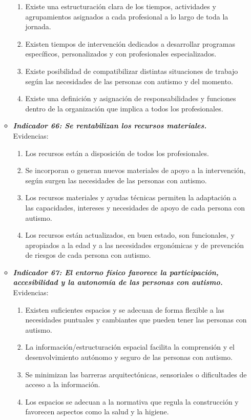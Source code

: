 \begin{itemize}
\begin{itemize}
		\begin{enumerate}
			\item Existe una estructuración clara de los tiempos, actividades y agrupamientos asignados a cada profesional a lo largo de toda la jornada. 
			\item Existen tiempos de intervención dedicados a desarrollar programas específicos, personalizados y con profesionales especializados.     
			\item Existe posibilidad de compatibilizar distintas situaciones de trabajo según las necesidades de las personas con autismo y del momento. 
			\item Existe una definición y asignación de responsabilidades y funciones dentro de la organización que implica a todos los profesionales.
		\end{enumerate}
		\item \textbf{\textit{Indicador 66: Se rentabilizan los recursos materiales.}}\\Evidencias:
		
		\begin{enumerate}
			\item Los recursos están a disposición de todos los profesionales. 
			\item Se incorporan o generan nuevos materiales de apoyo a la intervención, según surgen las necesidades de las personas con autismo. 
			\item Los recursos materiales y ayudas técnicas permiten la adaptación a las capacidades, intereses y necesidades de apoyo de cada persona con autismo. 
			\item Los recursos están actualizados, en buen estado, son funcionales, y apropiados a la edad y a las necesidades ergonómicas y de prevención de riesgos de cada persona con autismo. 
			 
		\end{enumerate}
		\item \textbf{\textit{Indicador 67: El entorno físico favorece la participación, accesibilidad y la autonomía de las personas con autismo.}}\\Evidencias:
		
		\begin{enumerate}
			\item Existen suficientes espacios y se adecuan de forma flexible a las necesidades puntuales y cambiantes que pueden tener las personas con autismo. 
			\item La información/estructuración espacial facilita la comprensión y el desenvolvimiento autónomo y seguro de las personas con autismo. 
			\item Se minimizan las barreras arquitectónicas, sensoriales o dificultades de acceso a la información. 
			\item Los espacios se adecuan a la normativa que regula la construcción y favorecen aspectos como la salud y la higiene.
		\end{enumerate}
	\end{itemize}


\end{itemize}
